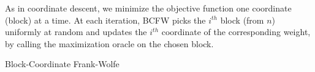 \documentclass{article}
\begin{document}
As in coordinate descent, we minimize the objective function one coordinate (block) at a time. At each iteration, BCFW picks the $i^{th}$ block (from $n$) uniformly at random and updates the $i^{th}$ coordinate of the corresponding weight, by calling the maximization oracle on the chosen block.
\begin{algorithm}[tb]
   \caption{Block-Coordinate Frank-Wolfe}
   \label{alg:example}
\begin{algorithmic}
    \\
    \ENDFOR
\end{algorithmic}
\end{algorithm}
\end{document}

